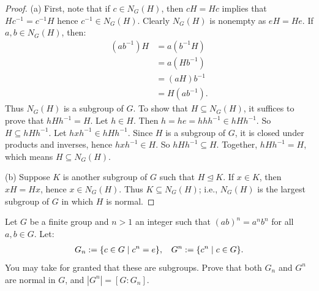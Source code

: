 \documentclass[10pt,twoside,openany]{memoir}
\begin{document}
    \begin{proof}
        (a) First, note that if $c \in N_G(H)$, then $cH = Hc$ implies that $Hc^{-1} = c^{-1}H$ \textemdash hence $c^{-1} \in N_G(H)$. Clearly $N_G(H)$ is nonempty as $eH = He$. If $a,b \in N_G(H)$, then:
            \begin{equation*}
            \begin{split}
                (ab^{-1})H
                & = a(b^{-1}H) \\
                & = a(Hb^{-1}) \\
                & = (aH)b^{-1} \\
                & = H(ab^{-1}).
            \end{split}
            \end{equation*}
        Thus $N_G(H)$ is a subgroup of $G$. To show that $H \subseteq N_G(H)$, it suffices to prove that $hHh^{-1} = H$. Let $h \in H$. Then $h = he = hhh^{-1} \in hHh^{-1}$. So $H \subseteq hHh^{-1}$. Let $hxh^{-1} \in hHh^{-1}$. Since $H$ is a subgroup of $G$, it is closed under products and inverses, hence $hxh^{-1} \in H$. So $hHh^{-1} \subseteq H$. Together, $hHh^{-1} = H$, which means $H \subseteq N_G(H)$.

        (b) Suppose $K$ is another subgroup of $G$ such that $H \trianglelefteq K$. If $x \in K$, then $xH = Hx$, hence $x \in N_G(H)$. Thus $K \subseteq N_G(H)$; i.e., $N_G(H)$ is the largest subgroup of $G$ in which  $H$ is normal.
    \end{proof}
\begin{problem}[W23, P1]
    Let $G$ be a finite group and $n > 1$ an integer such that $(ab)^n = a^n b^n$ for all $a,b \in G$. Let:
        \begin{equation*}
        \begin{split}
            G_n := \{c \in G \mid c^n = e\}, \h9 G^n := \{c^n \mid c \in G\}.
        \end{split}
        \end{equation*}
    You may take for granted that these are subgroups. Prove that both $G_n$ and $G^n$ are normal in $G$, and $|G^n| = [G:G_n]$.
\end{problem}
\end{document}
